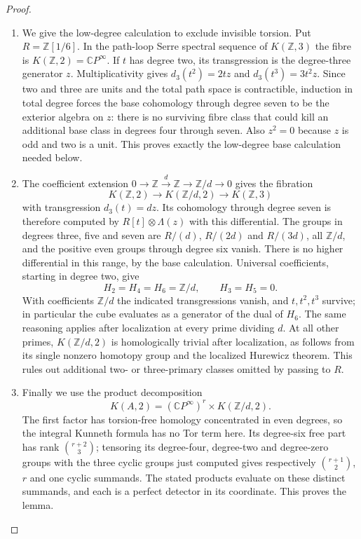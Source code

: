 \begin{proof}
\begin{enumerate}[label=\arabic*.,leftmargin=*]
\item We give the low-degree calculation to exclude invisible torsion.
Put $R=\mathbb Z[1/6]$. In the path-loop Serre spectral sequence of
$K(\mathbb Z,3)$ the fibre is $K(\mathbb Z,2)=\mathbb CP^\infty$.
If $t$ has degree two, its transgression is the degree-three
generator $z$. Multiplicativity gives
$d_3(t^2)=2tz$ and $d_3(t^3)=3t^2z$.
Since two and three are units and the total path space is
contractible, induction in total degree forces the base cohomology
through degree seven to be the exterior algebra on $z$:
there is no surviving fibre class that could kill an additional
base class in degrees four through seven. Also $z^2=0$ because
$z$ is odd and two is a unit. This proves exactly the low-degree
base calculation needed below.

\item The coefficient extension
$0\to\mathbb Z\xrightarrow{d}\mathbb Z\to\mathbb Z/d\to0$
gives the fibration
\[
 K(\mathbb Z,2)\longrightarrow K(\mathbb Z/d,2)
 \longrightarrow K(\mathbb Z,3)
\]
with transgression $d_3(t)=dz$. Its cohomology through degree seven
is therefore computed by $R[t]\otimes\Lambda(z)$ with this
 differential. The groups in degrees three, five and seven are
$R/(d)$, $R/(2d)$ and $R/(3d)$, all $\mathbb Z/d$, and the positive even
groups through degree six vanish. There is no higher differential
in this range, by the base calculation. Universal coefficients,
starting in degree two, give
\[
 H_2=H_4=H_6=\mathbb Z/d,\qquad H_3=H_5=0.
\]
With coefficients $\mathbb Z/d$ the indicated transgressions vanish,
and $t,t^2,t^3$ survive; in particular the cube evaluates as a
generator of the dual of $H_6$. The same reasoning applies after
localization at every prime dividing $d$. At all other primes,
$K(\mathbb Z/d,2)$ is homologically trivial after localization,
as follows from its single nonzero homotopy group and the localized
Hurewicz theorem. This rules out additional two- or three-primary
classes omitted by passing to $R$.

\item Finally we use the product decomposition
\[
 K(A,2)=(\mathbb CP^\infty)^r\times K(\mathbb Z/d,2).
\]
The first factor has torsion-free homology concentrated in even
degrees, so the integral Kunneth formula has no Tor term here.
Its degree-six free part has rank $\binom{r+2}{3}$; tensoring its
degree-four, degree-two and degree-zero groups with the three
cyclic groups just computed gives respectively
$\binom{r+1}{2}$, $r$ and one cyclic summands. The stated products
evaluate on these distinct summands, and each is a perfect
detector in its coordinate. This proves the lemma.
\end{enumerate}
\end{proof}

